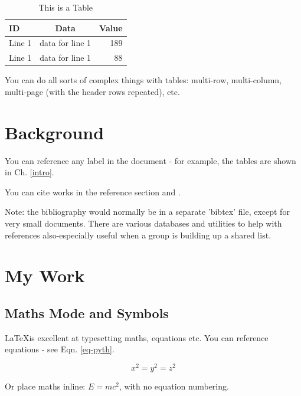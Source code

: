 \documentclass[a4paper,12pt]{report}
\begin{document}
\begin{table}[H]
\centering
\caption{This is a Table}
\begin{tabular}{|l|c|r|}
\hline
\textbf{ID} & \textbf{Data} & \textbf{Value} \\
\hline
Line 1 & data for line 1 & 189\\
\hline
Line 1 & data for line 1 & 88\\
\hline
\end{tabular}
\label{table-demo}
\end{table}

You can do all sorts of complex things with tables: multi-row, multi-column, multi-page (with the header rows repeated), etc.

\chapter{Background}

You can reference any label in the document - for example, the tables are shown in Ch. \ref{intro}.

You can cite works in the reference section \cite{Medina:2009} and \cite{Wilkes:1951}.

Note: the bibliography would normally be in a separate 'bibtex' file, except for very small documents. There are various databases and utilities to help with references also-especially useful when a group is building up a shared list.

\chapter{My Work}

\section{Maths Mode and Symbols}

\LaTeX is excellent at typesetting maths, equations etc. You can reference equations - see Eqn. \ref{eq-pyth}.

\begin{equation}
\label{eq-pyth}
x^2 = y^2 = z^2
\end{equation}

Or place maths inline: $E=mc^2$, with no equation numbering.
\end{document}
